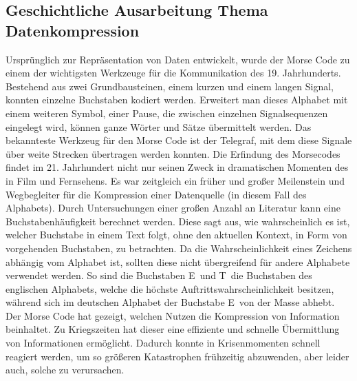 \subsection{Geschichtliche Ausarbeitung Thema Datenkompression}
\label{subsec:main_kompression}
Ursprünglich zur Repräsentation von Daten entwickelt, wurde der Morse Code zu einem der wichtigsten Werkzeuge für die Kommunikation des 19. Jahrhunderts. 
Bestehend aus zwei Grundbausteinen, einem kurzen und einem langen Signal, konnten einzelne Buchstaben kodiert werden. 
Erweitert man dieses Alphabet mit einem weiteren Symbol, einer Pause, die zwischen einzelnen Signalsequenzen eingelegt wird, können ganze Wörter und Sätze übermittelt werden. 
Das bekannteste Werkzeug für den Morse Code ist der Telegraf, mit dem diese Signale über weite Strecken übertragen werden konnten.
Die Erfindung des Morsecodes findet im 21. Jahrhundert nicht nur seinen Zweck in dramatischen Momenten des in Film und Fernsehens. 
Es war zeitgleich ein früher und großer Meilenstein und Wegbegleiter für die Kompression einer Datenquelle (in diesem Fall des Alphabets). 
Durch Untersuchungen einer großen Anzahl an Literatur kann eine Buchstabenhäufigkeit berechnet werden. 
Diese sagt aus, wie wahrscheinlich es ist, welcher Buchstabe in einem Text folgt, ohne den aktuellen Kontext, in Form von vorgehenden Buchstaben, zu betrachten.
Da die Wahrscheinlichkeit eines Zeichens abhängig vom Alphabet ist, sollten diese nicht übergreifend für andere Alphabete verwendet werden. 
So sind die Buchstaben \glqq E\grqq\ und \glqq T\grqq\ die Buchstaben des englischen Alphabets, welche die höchste Auftrittswahrscheinlichkeit besitzen, während sich im deutschen Alphabet der Buchstabe \glqq E\grqq\ von der Masse abhebt.
Der Morse Code hat gezeigt, welchen Nutzen die Kompression von Information beinhaltet.
Zu Kriegszeiten hat dieser eine effiziente und schnelle Übermittlung von Informationen ermöglicht.
Dadurch konnte in Krisenmomenten schnell reagiert werden, um so größeren Katastrophen frühzeitig abzuwenden, aber leider auch, solche zu verursachen.

